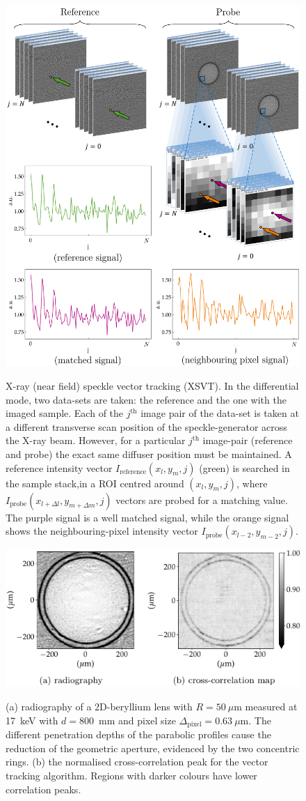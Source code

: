 \begin{refsection}
\begin{figure}[t]
        \centering
        {\includegraphics[width=.6\linewidth]{figures/ch04/speckle_data.pdf}}
        \caption[X-ray (near field) speckle vector tracking (XSVT)]{X-ray (near field) speckle vector tracking (XSVT). In the differential mode, two data-sets are taken: the reference and the one with the imaged sample. Each of the $j^\text{th}$ image pair of the data-set is taken at a different transverse scan position of the speckle-generator across the X-ray beam. However, for a particular $j^\text{th}$ image-pair
        (reference and probe) the exact same diffuser position must be maintained. A reference intensity vector $I_{\text{reference}}(x_l,y_m,j)$ (green) is searched in the sample stack,in a ROI centred around $(x_l,y_m,j)$, where $I_{\text{probe}}(x_{l+\Delta l},y_{m+\Delta m},j)$ vectors are probed for a matching value. The purple signal is a well matched signal, while the orange signal shows the neighbouring-pixel intensity vector $I_{\text{probe}}(x_{l-2},y_{m-2},j)$.}\label{fig:data_tracking}
\end{figure}
\begin{figure}[t]
        \centering
        {\includegraphics[width=.5\linewidth]{figures/ch04b/radio_corr_map.pdf}}
        \caption[Normalised cross-correlation map]{(a) radiography of a 2D-beryllium lens with $R=50~\mu$m measured at 17~keV with $d=800$~mm and pixel size $\Delta_\text{pixel}= 0.63~\mu$m. The different penetration depths of the parabolic profiles cause the reduction of the geometric aperture, evidenced by the two concentric rings. (b) the normalised cross-correlation peak for the vector tracking algorithm. Regions with darker colours have lower correlation peaks.}\label{fig:cross-correlation-map}
\end{figure}

\end{refsection}
